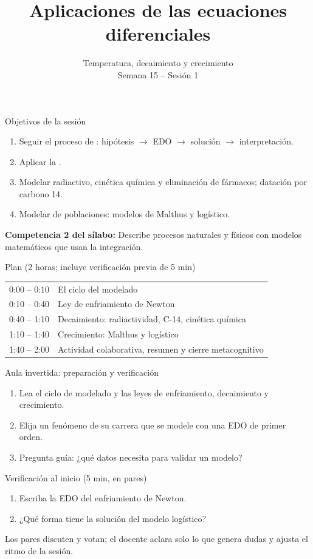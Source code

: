 \documentclass[10pt,aspectratio=169]{beamer}
\title[Aplicaciones de las EDO]{Aplicaciones de las ecuaciones diferenciales}
\subtitle{Temperatura, decaimiento y crecimiento\\[2pt]\small Semana 15 -- Sesión 1}
\begin{document}
\begin{frame}
  \titlepage
\end{frame}

\begin{frame}{Objetivos de la sesión}
  \begin{enumerate}
    \item Seguir el proceso de : hipótesis $\to$ EDO $\to$ solución $\to$ interpretación.
    \item Aplicar la .
    \item Modelar  radiactivo, cinética química y eliminación de fármacos; datación por carbono 14.
    \item Modelar  de poblaciones: modelos de Malthus y logístico.
  \end{enumerate}
  \vspace{1mm}
  {\small\textbf{Competencia 2 del sílabo:} Describe procesos naturales y físicos con modelos matemáticos que usan la integración.}
  \begin{block}{Plan (2 horas; incluye verificación previa de 5 min)}
    \begin{tabular}{ll}
      0:00 -- 0:10 & El ciclo del modelado\\
      0:10 -- 0:40 & Ley de enfriamiento de Newton\\
      0:40 -- 1:10 & Decaimiento: radiactividad, C-14, cinética química\\
      1:10 -- 1:40 & Crecimiento: Malthus y logístico\\
      1:40 -- 2:00 & Actividad colaborativa, resumen y cierre metacognitivo
    \end{tabular}
  \end{block}
\end{frame}

\begin{frame}{Aula invertida: preparación y verificación}
  \small
  \begin{previa}
    \begin{enumerate}
      \item Lea el ciclo de modelado y las leyes de enfriamiento, decaimiento y crecimiento.
      \item Elija un fenómeno de su carrera que se modele con una EDO de primer orden.
      \item Pregunta guía: ¿qué datos necesita para validar un modelo?
    \end{enumerate}
  \end{previa}
  \begin{block}{Verificación al inicio (5 min, en pares)}
    \begin{enumerate}
      \item Escriba la EDO del enfriamiento de Newton.
      \item ¿Qué forma tiene la solución del modelo logístico?
    \end{enumerate}
    Los pares discuten y votan; el docente aclara solo lo que genera dudas y ajusta el ritmo de la sesión.
  \end{block}
\end{frame}
\end{document}
